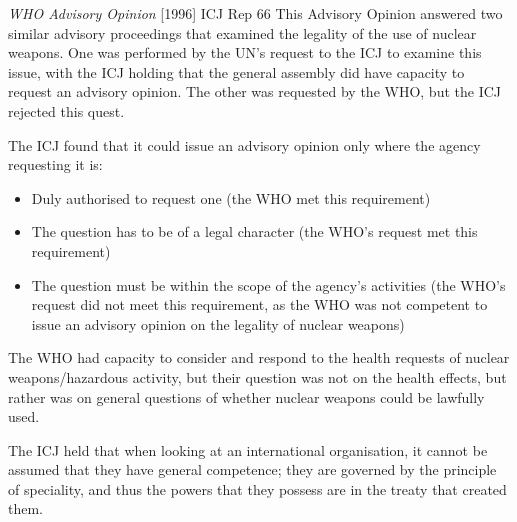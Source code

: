 \begin{casedetails}{\textit{WHO Advisory Opinion} [1996] ICJ Rep 66}
    \flushleft
    This Advisory Opinion answered two similar advisory proceedings that examined the legality of the use of nuclear weapons. One was performed by the UN's request to the ICJ to examine this issue, with the ICJ holding that the general assembly did have capacity to request an advisory opinion. The other was requested by the WHO, but the ICJ rejected this quest.

    \vspace{\baselineskip}

    The ICJ found that it could issue an advisory opinion only where the agency requesting it is:
    \begin{itemize}
        \item Duly authorised to request one (the WHO met this requirement)
        \item The question has to be of a legal character (the WHO's request met this requirement)
        \item The question must be within the scope of the agency's activities (the WHO's request did not meet this requirement, as the WHO was not competent to issue an advisory opinion on the legality of nuclear weapons)
    \end{itemize}
    The WHO had capacity to consider and respond to the health requests of nuclear weapons/hazardous activity, but their question was not on the health effects, but rather was on general questions of whether nuclear weapons could be lawfully used.

    \vspace{\baselineskip}

    The ICJ held that when looking at an international organisation, it cannot be assumed that they have general competence; they are governed by the principle of speciality, and thus the powers that they possess are in the treaty that created them.
\end{casedetails}


